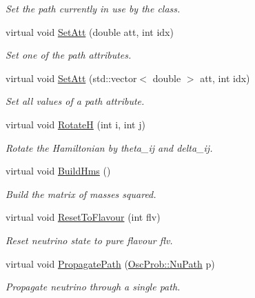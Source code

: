 \begin{DoxyCompactItemize}
\begin{DoxyCompactList}\small\item\em Set the path currently in use by the class. \end{DoxyCompactList}\item 
virtual void \hyperlink{classOscProb_1_1PMNS__Base_aba565962a440d14bee7a2a96d2eca2c5}{Set\+Att} (double att, int idx)
\begin{DoxyCompactList}\small\item\em Set one of the path attributes. \end{DoxyCompactList}\item 
virtual void \hyperlink{classOscProb_1_1PMNS__Base_aa001479b5f5828c3d16ed087f96ecbcc}{Set\+Att} (std\+::vector$<$ double $>$ att, int idx)
\begin{DoxyCompactList}\small\item\em Set all values of a path attribute. \end{DoxyCompactList}\item 
virtual void \hyperlink{classOscProb_1_1PMNS__Base_aae18afd69074211335f49ec40e6011b9}{RotateH} (int i, int j)
\begin{DoxyCompactList}\small\item\em Rotate the Hamiltonian by theta\+\_\+ij and delta\+\_\+ij. \end{DoxyCompactList}\item 
virtual void \hyperlink{classOscProb_1_1PMNS__Base_ad0faf5eae755afb1baa1fcd5ffebad41}{Build\+Hms} ()
\begin{DoxyCompactList}\small\item\em Build the matrix of masses squared. \end{DoxyCompactList}\item 
virtual void \hyperlink{classOscProb_1_1PMNS__Base_ac0d4bf8ff1318ef96d3dafa62e0cec25}{Reset\+To\+Flavour} (int flv)
\begin{DoxyCompactList}\small\item\em Reset neutrino state to pure flavour flv. \end{DoxyCompactList}\item 
virtual void \hyperlink{classOscProb_1_1PMNS__Base_accb08503acc162188041d7a96a280462}{Propagate\+Path} (\hyperlink{structOscProb_1_1NuPath}{Osc\+Prob\+::\+Nu\+Path} p)
\begin{DoxyCompactList}\small\item\em Propagate neutrino through a single path. \end{DoxyCompactList}\item 

\end{DoxyCompactItemize}
